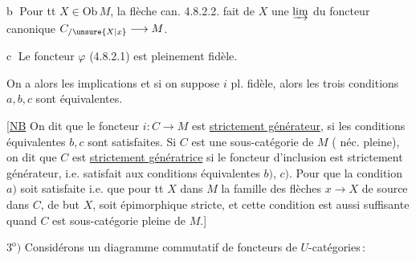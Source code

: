 
\textcircled{b} Pour tt $X\in\mathrm{Ob}\,M$, la flèche can. 4.8.2.2.
 fait de $X$ une $\varinjlim$ du foncteur
canonique $C_{/\unsure{X|x}}\longrightarrow M$.

\textcircled{c} Le foncteur $\varphi$ (4.8.2.1) est pleinement
fidèle.

On a alors les implications
et si on suppose $i$ pl. fidèle, alors les
trois conditions $a,b,c$ sont équivalentes.

[\uline{NB} On dit que le foncteur $i:C\longrightarrow M$
est \uline{strictement générateur}, si les conditions
équivalentes $b,c$ sont satisfaites. Si $C$ est
une sous-catégorie de $M$ ( néc. pleine),
on dit que $C$ est \uline{strictement génératrice}
si le foncteur d'inclusion est strictement
générateur, i.e. satisfait aux conditions
équivalentes $b)$, $c)$. Pour 
que la condition $a)$ soit satisfaite i.e.
que pour tt $X$ dans $M$ la famille
des flèches $x\longrightarrow X$ de source dans
$C$, de but $X$, soit épimorphique stricte,
et cette condition est aussi suffisante
quand $C$ est sous-catégorie pleine de $M$.]

$3^{\mathrm o})$ Considérons un diagramme commutatif
de foncteurs de $U$-catégories\,:

